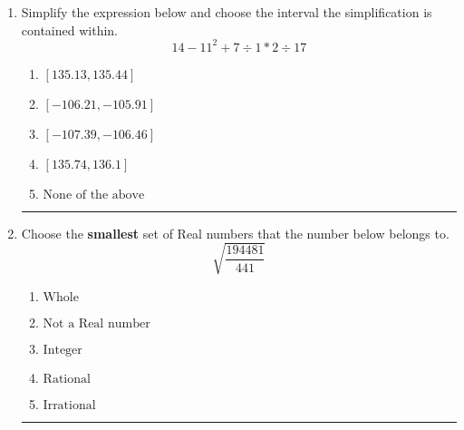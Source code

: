\documentclass[14pt]{extbook}
\newcommand{\litem}[1]{\item#1\hspace*{-1cm}\rule{\textwidth}{0.4pt}}
\begin{document}
\begin{enumerate}
{\begin{enumerate}[label=\Alph*.]
\end{enumerate} }
\litem{
Simplify the expression below and choose the interval the simplification is contained within.\[ 14 - 11^2 + 7 \div 1 * 2 \div 17 \]\begin{enumerate}[label=\Alph*.]
\item \( [135.13, 135.44] \)
\item \( [-106.21, -105.91] \)
\item \( [-107.39, -106.46] \)
\item \( [135.74, 136.1] \)
\item \( \text{None of the above} \)

\end{enumerate} }
\litem{
Choose the \textbf{smallest} set of Real numbers that the number below belongs to.\[ \sqrt{\frac{194481}{441}} \]\begin{enumerate}[label=\Alph*.]
\item \( \text{Whole} \)
\item \( \text{Not a Real number} \)
\item \( \text{Integer} \)
\item \( \text{Rational} \)
\item \( \text{Irrational} \)

\end{enumerate} }
\end{enumerate}
\end{document}
